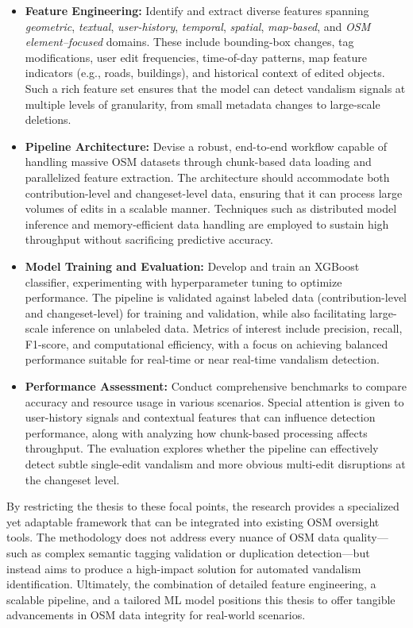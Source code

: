 \documentclass[
    13pt, %
    a4paper, %
    listof=totoc, %
    bibliography=totoc, %
    index=totoc, %
    headsepline
]{scrreprt}
\begin{document}
\begin{itemize}
    \item \textbf{Feature Engineering:} Identify and extract diverse features spanning \emph{geometric}, \emph{textual}, \emph{user-history}, \emph{temporal}, \emph{spatial}, \emph{map-based}, and \emph{OSM element–focused} domains. These include bounding-box changes, tag modifications, user edit frequencies, time-of-day patterns, map feature indicators (e.g., roads, buildings), and historical context of edited objects. Such a rich feature set ensures that the model can detect vandalism signals at multiple levels of granularity, from small metadata changes to large-scale deletions.
    \item \textbf{Pipeline Architecture:} Devise a robust, end-to-end workflow capable of handling massive OSM datasets through chunk-based data loading and parallelized feature extraction. The architecture should accommodate both contribution-level and changeset-level data, ensuring that it can process large volumes of edits in a scalable manner. Techniques such as distributed model inference and memory-efficient data handling are employed to sustain high throughput without sacrificing predictive accuracy.
    \item \textbf{Model Training and Evaluation:} Develop and train an XGBoost classifier, experimenting with hyperparameter tuning to optimize performance. The pipeline is validated against labeled data (contribution-level and changeset-level) for training and validation, while also facilitating large-scale inference on unlabeled data. Metrics of interest include precision, recall, F1-score, and computational efficiency, with a focus on achieving balanced performance suitable for real-time or near real-time vandalism detection.
    \item \textbf{Performance Assessment:} Conduct comprehensive benchmarks to compare accuracy and resource usage in various scenarios. Special attention is given to user-history signals and contextual features that can influence detection performance, along with analyzing how chunk-based processing affects throughput. The evaluation explores whether the pipeline can effectively detect subtle single-edit vandalism and more obvious multi-edit disruptions at the changeset level.
\end{itemize}

By restricting the thesis to these focal points, the research provides a specialized yet adaptable framework that can be integrated into existing OSM oversight tools. The methodology does not address every nuance of OSM data quality—such as complex semantic tagging validation or duplication detection—but instead aims to produce a high-impact solution for automated vandalism identification. Ultimately, the combination of detailed feature engineering, a scalable pipeline, and a tailored ML model positions this thesis to offer tangible advancements in OSM data integrity for real-world scenarios.
\end{document}

